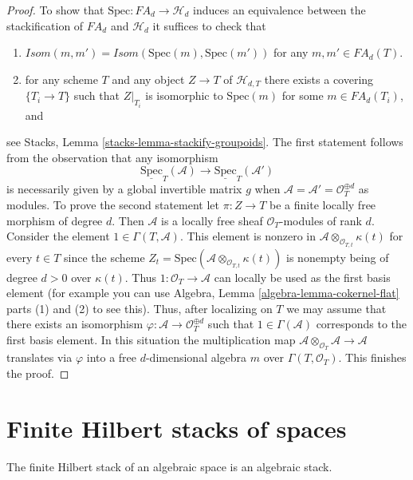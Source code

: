 \begin{proof}
\medskip\noindent
To show that $\text{Spec} : FA_d \to \mathcal{H}_d$ induces an equivalence
between the stackification of $FA_d$ and $\mathcal{H}_d$ it suffices to
check that
\begin{enumerate}
\item $\mathit{Isom}(m, m') = \mathit{Isom}(\text{Spec}(m), \text{Spec}(m'))$
for any $m, m' \in FA_d(T)$.
\item for any scheme $T$ and any object $Z \to T$ of $\mathcal{H}_{d, T}$
there exists a covering $\{T_i \to T\}$ such that $Z|_{T_i}$ is
isomorphic to $\text{Spec}(m)$ for some $m \in FA_d(T_i)$, and
\end{enumerate}
see
Stacks, Lemma \ref{stacks-lemma-stackify-groupoids}.
The first statement follows from the observation that any isomorphism
$$
\underline{\text{Spec}}_T(\mathcal{A})
\longrightarrow
\underline{\text{Spec}}_T(\mathcal{A}')
$$
is necessarily given by a global invertible matrix $g$ when
$\mathcal{A} = \mathcal{A}' = \mathcal{O}_T^{\oplus d}$ as modules.
To prove the second statement let $\pi : Z \to T$ be a finite
locally free morphism of degree $d$. Then $\mathcal{A}$ is a locally
free sheaf $\mathcal{O}_T$-modules of rank $d$.
Consider the element $1 \in \Gamma(T, \mathcal{A})$. This element is
nonzero in $\mathcal{A} \otimes_{\mathcal{O}_{T, t}} \kappa(t)$
for every $t \in T$ since the scheme
$Z_t = \text{Spec}(\mathcal{A} \otimes_{\mathcal{O}_{T, t}} \kappa(t))$
is nonempty being of degree $d > 0$ over $\kappa(t)$. Thus
$1 : \mathcal{O}_T \to \mathcal{A}$ can locally be used as the first
basis element (for example you can use
Algebra, Lemma \ref{algebra-lemma-cokernel-flat} parts (1) and (2)
to see this). Thus, after localizing on
$T$ we may assume that there exists an isomorphism
$\varphi : \mathcal{A} \to \mathcal{O}_T^{\oplus d}$
such that $1 \in \Gamma(\mathcal{A})$ corresponds to the first basis element.
In this situation the multiplication map
$\mathcal{A} \otimes_{\mathcal{O}_T} \mathcal{A} \to \mathcal{A}$
translates via $\varphi$ into a free $d$-dimensional algebra $m$ over
$\Gamma(T, \mathcal{O}_T)$. This finishes the proof.
\end{proof}




\section{Finite Hilbert stacks of spaces}
\label{section-spaces-hilbert}

\noindent
The finite Hilbert stack of an algebraic space is an algebraic stack.

